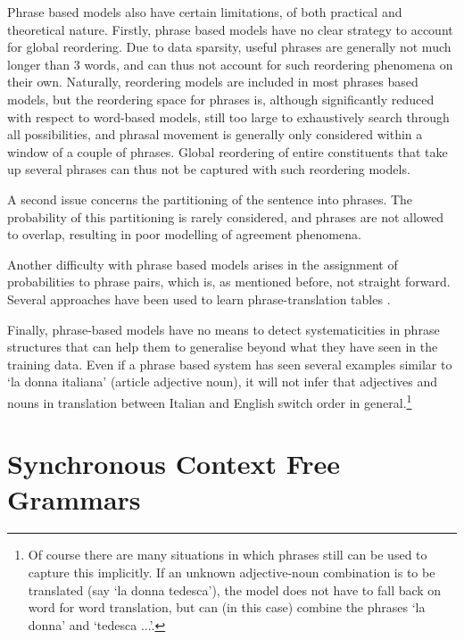 Phrase based models also have certain limitations, of both practical and theoretical nature. Firstly, phrase based models have no clear strategy to account for global reordering. Due to data sparsity, useful phrases are generally not much longer than 3 words, and can thus not account for such reordering phenomena on their own. Naturally, reordering models are included in most phrases based models, but the reordering space for phrases is, although significantly reduced with respect to word-based models, still too large to exhaustively search through all possibilities, and phrasal movement is generally only considered within a window of a couple of phrases. Global reordering of entire constituents that take up several phrases can thus not be captured with such reordering models.

A second issue concerns the partitioning of the sentence into phrases. The probability of this partitioning is rarely considered, and phrases are not allowed to overlap, resulting in poor modelling of agreement phenomena. 

Another difficulty with phrase based models arises in the assignment of probabilities to phrase pairs, which is, as mentioned before, not straight forward. Several approaches have been used to learn phrase-translation tables \citep[see][p.130]{koehn2008statistical}. 

Finally, phrase-based models have no means to detect systematicities in phrase structures that can help them to generalise beyond what they have seen in the training data. Even if a phrase based system has seen several examples similar to `la donna italiana' (article adjective noun), it will not infer that adjectives and nouns in translation between Italian and English switch order in general.\footnote{Of course there are many situations in which phrases still can be used to capture this implicitly. If an unknown adjective-noun combination is to be translated (say `la donna tedesca'), the model does not have to fall back on word for word translation, but can (in this case) combine the phrases `la donna' and `tedesca ...'.}

\section{Synchronous Context Free Grammars}
\label{sec:SCFGs}


